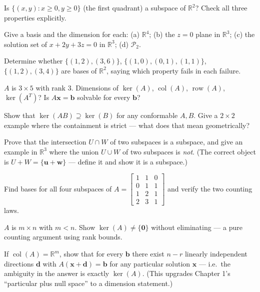 \begin{exercise}[easy]
Is $\{(x,y):x\ge0,y\ge0\}$ (the first quadrant) a subspace of $\mathbb{R}^2$? Check all three properties explicitly.
\end{exercise}
\begin{exercise}[easy]
Give a basis and the dimension for each: (a) $\mathbb{R}^4$; (b) the $z=0$ plane in $\mathbb{R}^3$; (c) the solution set of $x+2y+3z=0$ in $\mathbb{R}^3$; (d) $\mathcal{P}_2$.
\end{exercise}
\begin{exercise}[easy]
Determine whether $\{(1,2),(3,6)\}$, $\{(1,0),(0,1),(1,1)\}$, $\{(1,2),(3,4)\}$ are bases of $\mathbb{R}^2$, saying which property fails in each failure.
\end{exercise}
\begin{exercise}[easy]
$A$ is $3\times5$ with rank 3. Dimensions of $\ker(A)$, $\operatorname{col}(A)$, $\operatorname{row}(A)$, $\ker(A^{T})$? Is $A\mathbf{x}=\mathbf{b}$ solvable for every $\mathbf{b}$?
\end{exercise}
\begin{exercise}[medium]
Show that $\ker(AB)\supseteq\ker(B)$ for any conformable $A,B$. Give a $2\times2$ example where the containment is strict — what does that mean geometrically?
\end{exercise}
\begin{exercise}[medium]
Prove that the intersection $U\cap W$ of two subspaces is a subspace, and give an example in $\mathbb{R}^3$ where the union $U\cup W$ of two subspaces is \emph{not}. (The correct object is $U+W=\{\mathbf{u}+\mathbf{w}\}$ — define it and show it is a subspace.)
\end{exercise}
\begin{exercise}[medium]
Find bases for all four subspaces of $A=\begin{bmatrix}1&1&0\\0&1&1\\1&2&1\\2&3&1\end{bmatrix}$ and verify the two counting laws.
\end{exercise}
\begin{exercise}[medium]
$A$ is $m\times n$ with $m<n$. Show $\ker(A)\neq\{\mathbf{0}\}$ without eliminating — a pure counting argument using rank bounds.
\end{exercise}
\begin{exercise}
If $\operatorname{col}(A)=\mathbb{R}^m$, show that for every $\mathbf{b}$ there exist $n-r$ linearly independent directions $\mathbf{d}$ with $A(\mathbf{x}+\mathbf{d})=\mathbf{b}$ for any particular solution $\mathbf{x}$ — i.e.\ the ambiguity in the answer is exactly $\ker(A)$. (This upgrades Chapter 1's ``particular plus null space'' to a dimension statement.)
\end{exercise}
